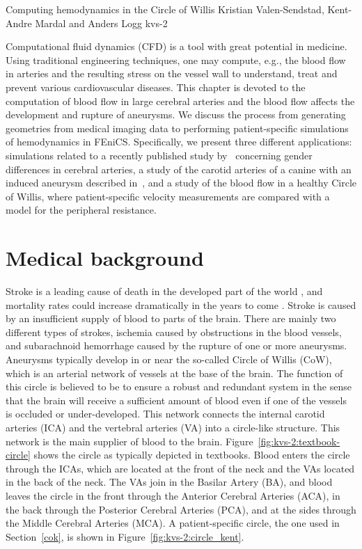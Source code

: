               {Computing hemodynamics in the Circle of Willis}
              {Kristian Valen-Sendstad, Kent-Andre Mardal and Anders Logg}
              {kvs-2}

Computational fluid dynamics (CFD) is a tool with great potential in
medicine. Using traditional engineering techniques, one may compute,
e.g., the blood flow in arteries and the resulting stress on the
vessel wall to understand, treat and prevent various cardiovascular
diseases. This chapter is devoted to the computation of blood flow in
large cerebral arteries and the blood flow affects the development
and rupture of
aneurysms. We discuss the process from generating geometries from
medical imaging data to performing patient-specific simulations of
hemodynamics in FEniCS.  Specifically, we present three different
applications: simulations related to a recently published study
by~\citet{LindekleivValen-SendstadMorganEtAl2010} concerning gender
differences in cerebral arteries, a study of the carotid arteries of a
canine with an induced aneurysm described
in~\citet{JiangJohnsonValen-SendstadEtAl2010}, and a study of the blood
flow in a healthy Circle of Willis, where patient-specific velocity
measurements are compared with a model for the peripheral resistance.

\section{Medical background} \label{Medical_Background}

Stroke is a leading cause of death in the developed part of the
world \citep{Feigin2005}, and mortality rates could increase dramatically
in the years to come \citep{MurrayLopez1997}. Stroke is caused by an
insufficient supply of blood to parts of the brain. There are mainly
two different types of strokes, ischemia caused by obstructions in
the blood vessels, and subarachnoid hemorrhage caused by the rupture
of one or more aneurysms. Aneurysms typically
develop in or near the so-called Circle of Willis (CoW), which is an
arterial network of vessels at the base of the brain. The function of
this circle is believed to be to ensure a robust and redundant system
in the sense that the brain will receive a sufficient amount of blood
even if one of the vessels is occluded or under-developed. This network
connects the internal carotid arteries (ICA) and the vertebral arteries
(VA) into a circle-like structure. This network is the main supplier
of blood to the brain. Figure~\ref{fig:kvs-2:textbook-circle} shows
the circle as typically depicted in textbooks. Blood enters the circle
through the ICAs, which are located at the front of the neck and the VAs
located in the back of the neck.  The VAs join in the Basilar Artery
(BA), and blood leaves the circle in the front through the Anterior
Cerebral Arteries (ACA), in the back through the Posterior Cerebral
Arteries (PCA), and at the sides through the Middle Cerebral Arteries
(MCA). A patient-specific circle, the one used in Section~\ref{cok},
is shown in Figure~\ref{fig:kvs-2:circle_kent}.

